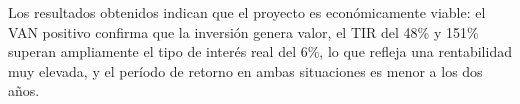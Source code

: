 \documentclass[../main.tex]{subfiles}
\begin{document}
Los resultados obtenidos indican que el proyecto es económicamente viable: el VAN positivo confirma que la inversión genera valor, el TIR del 48\% y 151\% superan ampliamente el tipo de interés real del 6\%, lo que refleja una rentabilidad muy elevada, y el período de retorno en ambas situaciones es menor a los dos años.

\newpage
\end{document}
